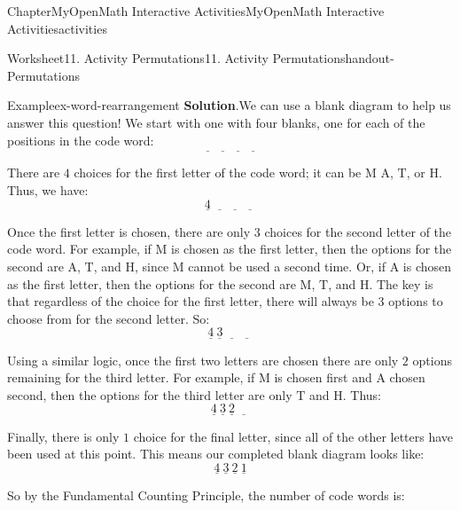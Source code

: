 \documentclass[oneside,10pt,]{book}
\newcommand{\blocktitlefont}{\relax}
\begin{document}
\begin{chapterptx}{Chapter}{MyOpenMath Interactive Activities}{}{MyOpenMath Interactive Activities}{}{}{activities}
\begin{worksheet-section}{Worksheet}{11. Activity Permutations}{}{11. Activity Permutations}{}{}{handout-Permutations}
\begin{example}{Example}{}{ex-word-rearrangement}
\noindent\textbf{\blocktitlefont Solution}.\hypertarget{ex-word-rearrangement-2}{}\quad{}We can use a blank diagram to help us answer this question! We start with one with four blanks, one for each of the positions in the code word:%
\begin{equation*}
\underline{\quad} \ \underline{\quad} \ \underline{\quad} \ \underline{\quad}
\end{equation*}
%
\par
There are \(4\) choices for the first letter of the code word; it can be \(\text{M}\) \(\text{A}\), \(\text{T}\), or \(\text{H}\). Thus, we have:%
\begin{equation*}
\underline{4} \ \underline{\quad} \ \underline{\quad} \ \underline{\quad}
\end{equation*}
%
\par
Once the first letter is chosen, there are only \(3\) choices for the second letter of the code word. For example, if \(\text{M}\) is chosen as the first letter, then the options for the second are \(\text{A}\), \(\text{T}\), and \(\text{H}\), since \(\text{M}\) cannot be used a second time. Or, if \(\text{A}\) is chosen as the first letter, then the options for the second are \(\text{M}\), \(\text{T}\), and \(\text{H}\). The key is that regardless of the choice for the first letter, there will always be \(3\) options to choose from for the second letter. So:%
\begin{equation*}
\underline{4} \ \underline{3} \ \underline{\quad} \ \underline{\quad}
\end{equation*}
%
\par
Using a similar logic, once the first two letters are chosen there are only \(2\) options remaining for the third letter. For example, if \(\text{M}\) is chosen first and \(\text{A}\) chosen second, then the options for the third letter are only \(\text{T}\) and \(\text{H}\). Thus:%
\begin{equation*}
\underline{4} \ \underline{3} \ \underline{2} \ \underline{\quad}
\end{equation*}
%
\par
Finally, there is only \(1\) choice for the final letter, since all of the other letters have been used at this point. This means our completed blank diagram looks like:%
\begin{equation*}
\underline{4} \ \underline{3} \ \underline{2} \ \underline{1}
\end{equation*}
%
\par
So by the Fundamental Counting Principle, the number of code words is:%

\end{example}
\end{worksheet-section}
\end{chapterptx}
\end{document}
